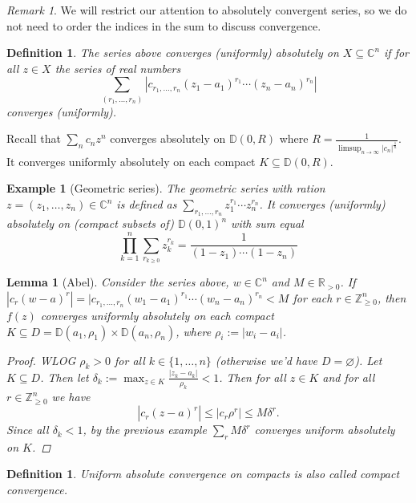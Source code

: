 \documentclass[12pt]{article}
\theoremstyle{darkgreentheorem}
\newtheorem{lm}[thm]{Lemma}
\theoremstyle{darkbluedefinition}
\newtheorem{defn}[thm]{Definition}
\theoremstyle{darkredexample}
\newtheorem{exa}[thm]{Example}
\theoremstyle{remark}
\newtheorem{rem}[thm]{Remark}
\newcommand{\Z}{\mathbb{Z}}
\newcommand{\R}{\mathbb{R}}
\newcommand{\1}{\mathbbm{1}}
\newcommand{\C}{\mathbb{C}}
\newcommand{\bbD}{\mathbb{D}}
\begin{document}
\begin{rem}
    We will restrict our attention to absolutely convergent series, so we do not need to order the indices in the sum to discuss convergence.
\end{rem}

\begin{defn}
    The series above \textit{converges (uniformly) absolutely} on $X\subseteq \C^{n}$ if for all $z\in X$ the series of real numbers
    \[\sum_{(r_{1},\ldots,r_{n})} |c_{r_{1},\ldots,r_{n}}(z_{1}-a_{1})^{r_{1}}\cdots (z_{n}-a_{n})^{r_{n}}| \]
    converges (uniformly).
\end{defn}

Recall that $\sum_{n}c_{n}z^{n}$ converges absolutely on $\bbD(0,R)$ where $R=\frac{1}{\operatorname{limsup}_{n\to\infty}{|c_{n}|^{\frac{1}{n}}}}$.
It converges uniformly absolutely on each compact $K\subseteq \bbD(0,R)$.

\begin{exa}[Geometric series]
    The geometric series with ration $z=(z_{1},\ldots,z_{n})\in \C^{n}$ is defined as $\sum_{r_{1},\ldots,r_{n}}z_{1}^{r_{1}}\cdots z_{n}^{r_{n}}$.
    It converges (uniformly) absolutely on (compact subsets of) $\bbD(0,1)^{n}$ with sum equal
    \[ \prod_{k=1}^{n}\sum_{r_{k\geqslant 0}}z_{k}^{r_{k}}=\frac{1}{(1-z_{1})\cdots (1-z_{n})} \]
\end{exa}

\begin{lm}[Abel]
    Consider the series above, $w\in \C^{n}$ and $M\in \R_{>0}$.
    If $|c_{r}(w-a)^{r}|=|c_{r_{1},\ldots,r_{n}}(w_{1}-a_{1})^{r_{1}}\cdots (w_{n}-a_{n})^{r_{n}}<M$ for each $r\in \Z^{n}_{\geqslant 0}$, then $f(z)$ converges uniformly absolutely on each compact $K\subseteq D=\bbD(a_{1},\rho_{1})\times \bbD(a_{n},\rho_{n})$, where $\rho_{i}:=|w_{i}-a_{i}|$.
    \begin{proof}
	WLOG $\rho_{k}>0$ for all $k\in \{1,\ldots,n\}$ (otherwise we'd have $D=\varnothing$).
	Let $K\subseteq D$.
	Then let $\delta_{k}:=\max_{z\in K}\frac{|z_{k}-a_{k}|}{\rho_{k}}<1 $.
	Then for all $z\in K$ and for all $r\in \Z^{n}_{\geqslant 0}$ we have
	\[ |c_{r}(z-a)^{r}|\leqslant |c_{r}\rho^{r}|\leqslant M\delta^{r}.\]
	Since all $\delta_{k}<1$, by the previous example $\sum_{r}M\delta^{r}$ converges uniform absolutely on $K$.
    \end{proof}
\end{lm}

\begin{defn}
    Uniform absolute convergence on compacts is also called \textit{compact convergence}.
\end{defn}
\end{document}
